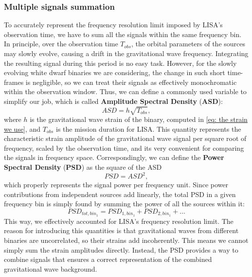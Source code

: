 \subsubsection{Multiple signals summation}
To accurately represent the frequency resolution limit imposed by LISA's observation time, we have to sum all the signals within the same frequency bin. 
In principle, over the observation time $T_{obs}$, the orbital parameters of the sources may slowly evolve, causing a drift in the gravitational wave frequency. 
Integrating the resulting signal during this period is no easy task.
However, for the slowly evolving white dwarf binaries we are considering, the change in such short time-frames is negligible, so we can treat their signals as effectively monochromatic within the observation window. 
Thus, we can define a commonly used variable to simplify our job, which is called  \textbf{Amplitude Spectral Density} (\textbf{ASD}):
\begin{equation}
    ASD = h\sqrt{T_{obs}},
    \label{eq: ASD definition}
\end{equation}
where $h$ is the gravitational wave strain of the binary, computed in \eqref{eq: the strain we use}, and $T_{obs}$ is the mission duration for LISA.
This quantity represents the characteristic strain amplitude of the gravitational wave signal per square root of frequency, scaled by the observation time, and its very convenient for comparing the signals in frequency space.
Correspondingly, we can define the \textbf{Power Spectral Density} (\textbf{PSD}) as the square of the ASD
\begin{equation}
    PSD = ASD^2,
    \label{eq: PSD definition}
\end{equation}
which properly represents the signal power per frequency unit.
Since power contributions from independent sources add linearly, the total PSD in a given frequency bin is simply found by summing the power of all the sources within it:
\begin{equation}
    PSD_{tot,bin_1} = PSD_{1,bin_1} + PSD_{2,bin_1} + \dots
    \label{eq: total PSD}
\end{equation}
This way, we effectively accounted for LISA's frequency resolution limit.
The reason for introducing this quantities is that gravitational waves from different binaries are uncorrelated, so their strains add incoherently. 
This means we cannot simply sum the strain amplitudes directly.
Instead, the PSD provides a way to combine signals that ensures a correct representation of the combined gravitational wave background.

